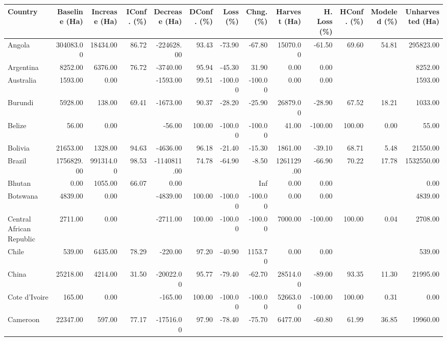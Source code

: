 \begin{table}[ht]
\centering
\begin{tabular}{lrrrrrrrrrrrr}
  \hline
Country & Baseline (Ha) & Increase (Ha) & IConf. (\%) & Decrease (Ha) & DConf. (\%) & Loss (\%) & Chng. (\%) & Harvest (Ha) & H. Loss (\%) & HConf. (\%) & Modeled (\%) & Unharvested (Ha) \\ 
  \hline
Angola & 304083.00 & 18434.00 & 86.72 & -224628.00 & 93.43 & -73.90 & -67.80 & 15070.00 & -61.50 & 69.60 & 54.81 & 295823.00 \\ 
  Argentina & 8252.00 & 6376.00 & 76.72 & -3740.00 & 95.94 & -45.30 & 31.90 & 0.00 & 0.00 &  &  & 8252.00 \\ 
  Australia & 1593.00 & 0.00 &  & -1593.00 & 99.51 & -100.00 & -100.00 & 0.00 & 0.00 &  &  & 1593.00 \\ 
  Burundi & 5928.00 & 138.00 & 69.41 & -1673.00 & 90.37 & -28.20 & -25.90 & 26879.00 & -28.90 & 67.52 & 18.21 & 1033.00 \\ 
  Belize & 56.00 & 0.00 &  & -56.00 & 100.00 & -100.00 & -100.00 & 41.00 & -100.00 & 100.00 & 0.00 & 55.00 \\ 
  Bolivia & 21653.00 & 1328.00 & 94.63 & -4636.00 & 96.18 & -21.40 & -15.30 & 1861.00 & -39.10 & 68.71 & 5.48 & 21550.00 \\ 
  Brazil & 1756829.00 & 991314.00 & 98.53 & -1140811.00 & 74.78 & -64.90 & -8.50 & 1261129.00 & -66.90 & 70.22 & 17.78 & 1532550.00 \\ 
  Bhutan & 0.00 & 1055.00 & 66.07 & 0.00 &  &  & Inf & 0.00 & 0.00 &  &  & 0.00 \\ 
  Botswana & 4839.00 & 0.00 &  & -4839.00 & 100.00 & -100.00 & -100.00 & 0.00 & 0.00 &  &  & 4839.00 \\ 
  Central African Republic & 2711.00 & 0.00 &  & -2711.00 & 100.00 & -100.00 & -100.00 & 7000.00 & -100.00 & 100.00 & 0.04 & 2708.00 \\ 
  Chile & 539.00 & 6435.00 & 78.29 & -220.00 & 97.20 & -40.90 & 1153.70 & 0.00 & 0.00 &  &  & 539.00 \\ 
  China & 25218.00 & 4214.00 & 31.50 & -20022.00 & 95.77 & -79.40 & -62.70 & 28514.00 & -89.00 & 93.35 & 11.30 & 21995.00 \\ 
  Cote d'Ivoire & 165.00 & 0.00 &  & -165.00 & 100.00 & -100.00 & -100.00 & 52663.00 & -100.00 & 100.00 & 0.31 & 0.00 \\ 
  Cameroon & 22347.00 & 597.00 & 77.17 & -17516.00 & 97.90 & -78.40 & -75.70 & 6477.00 & -60.80 & 61.99 & 36.85 & 19960.00 \\ 

\end{tabular}
\end{table}
